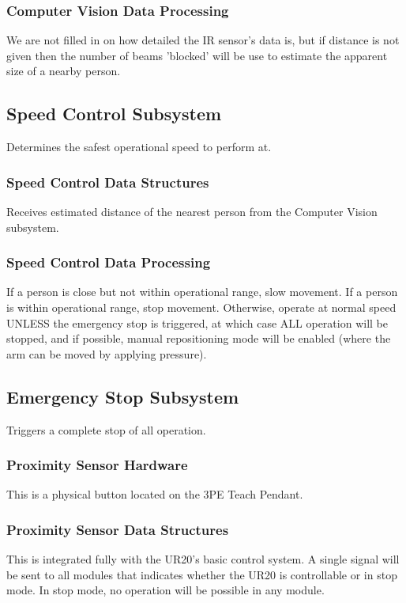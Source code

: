 \subsubsection{Computer Vision Data Processing}
We are not filled in on how detailed the IR sensor's data is, but if distance is not given then the number of beams 'blocked' will be use to estimate the apparent size of a nearby person.


\subsection{Speed Control Subsystem}
Determines the safest operational speed to perform at.

\subsubsection{Speed Control Data Structures}
Receives estimated distance of the nearest person from the Computer Vision subsystem.

\subsubsection{Speed Control Data Processing}
If a person is close but not within operational range, slow movement. If a person is within operational range, stop movement. Otherwise, operate at normal speed UNLESS the emergency stop is triggered, at which case ALL operation will be stopped, and if possible, manual repositioning mode will be enabled (where the arm can be moved by applying pressure).

\subsection{Emergency Stop Subsystem}
Triggers a complete stop of all operation.

\subsubsection{Proximity Sensor Hardware}
This is a physical button located on the 3PE Teach Pendant. 

\subsubsection{Proximity Sensor Data Structures}
This is integrated fully with the UR20's basic control system. A single signal will be sent to all modules that indicates whether the UR20 is controllable or in stop mode. In stop mode, no operation will be possible in any module.
